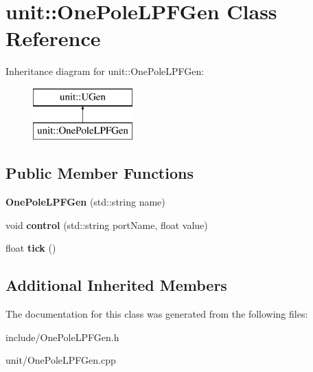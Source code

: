 \hypertarget{classunit_1_1OnePoleLPFGen}{\section{unit\-:\-:One\-Pole\-L\-P\-F\-Gen Class Reference}
\label{classunit_1_1OnePoleLPFGen}
}
Inheritance diagram for unit\-:\-:One\-Pole\-L\-P\-F\-Gen\-:\begin{figure}[H]
\begin{center}
\leavevmode
\includegraphics[height=2.000000cm]{classunit_1_1OnePoleLPFGen}
\end{center}
\end{figure}
\subsection*{Public Member Functions}
\begin{DoxyCompactItemize}
\item 
\hypertarget{classunit_1_1OnePoleLPFGen_aea39a9562852ac47fdd576fd8b583b9f}{{\bfseries One\-Pole\-L\-P\-F\-Gen} (std\-::string name)}\label{classunit_1_1OnePoleLPFGen_aea39a9562852ac47fdd576fd8b583b9f}

\item 
\hypertarget{classunit_1_1OnePoleLPFGen_a8f2df9b7406edadf7dc34e7e65b2b67c}{void {\bfseries control} (std\-::string port\-Name, float value)}\label{classunit_1_1OnePoleLPFGen_a8f2df9b7406edadf7dc34e7e65b2b67c}

\item 
\hypertarget{classunit_1_1OnePoleLPFGen_a5e5288841ff8112113f2d6ec1f03f375}{float {\bfseries tick} ()}\label{classunit_1_1OnePoleLPFGen_a5e5288841ff8112113f2d6ec1f03f375}

\end{DoxyCompactItemize}
\subsection*{Additional Inherited Members}


The documentation for this class was generated from the following files\-:\begin{DoxyCompactItemize}
\item 
include/One\-Pole\-L\-P\-F\-Gen.\-h\item 
unit/One\-Pole\-L\-P\-F\-Gen.\-cpp\end{DoxyCompactItemize}
